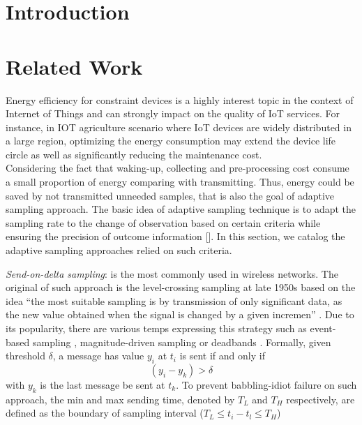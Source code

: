 \section{Introduction}

\section{Related Work}
Energy efficiency for constraint devices is a highly interest topic in the context of Internet of Things and can strongly impact on the quality of IoT services. For instance, in IOT agriculture scenario where IoT devices are widely distributed in a large region, optimizing the energy consumption may extend the device life circle as well as significantly reducing the maintenance cost.\\

Considering the fact that waking-up, collecting and pre-processing cost consume a small proportion of energy comparing with transmitting. Thus, energy could be saved by not transmitted unneeded samples, that is also the goal of adaptive sampling approach. The basic idea of adaptive sampling technique is to adapt the sampling rate to the change of observation based on certain criteria  while ensuring the precision  of outcome information []. In this section, we catalog the adaptive sampling approaches relied on such criteria.
\par \textit{Send-on-delta sampling}: is the most commonly used in wireless networks. The original of such approach is the level-crossing sampling at late 1950s based on the idea ``the most suitable sampling is by transmission of only significant data, as the new value obtained when the signal is changed by a given incremen'' \cite{ellis1959extension}. Due to its popularity, there are various temps expressing this strategy such as event-based sampling \cite{940692},  magnitude-driven sampling \cite{persson2001event} or deadbands \cite{otanez2002using}. Formally, given threshold $ \delta $, a message has value $ y_i $ at $ t_i $ is sent if and only if 
\begin{equation}\label{key}
(y_i - y_k) > \delta
\end{equation}
with $ y_k $ is the last message be sent at $ t_k $. To prevent babbling-idiot failure on such approach, the min and max sending time, denoted by $ T_L $ and $ T_H $ respectively, are defined as the boundary of sampling interval ($ T_L \leq t_i - t_l \leq T_H $)\\

